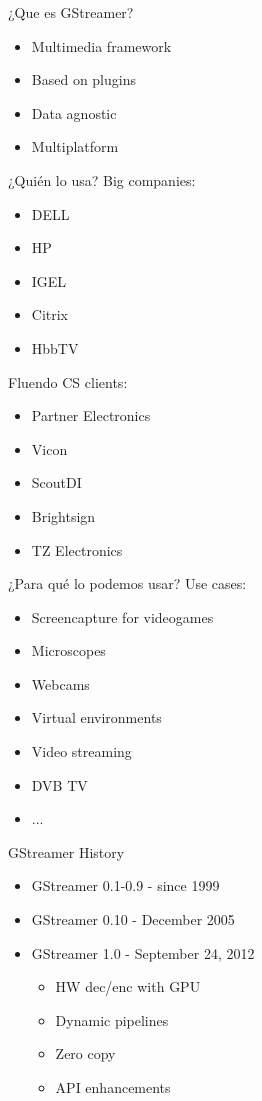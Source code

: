 \documentclass{beamer}
\begin{document}
\begin{frame}{¿Que es GStreamer?}
\begin{itemize}
  \item Multimedia framework
  \item Based on plugins
  \item Data agnostic
  \item Multiplatform
\end{itemize}
\end{frame}

\begin{frame}{¿Quién lo usa?}
Big companies:
\begin{itemize}
  \item DELL
  \item HP
  \item IGEL
  \item Citrix
  \item HbbTV
\end{itemize}
Fluendo CS clients:
\begin{itemize}
  \item Partner Electronics
  \item Vicon
  \item ScoutDI
  \item Brightsign
  \item TZ Electronics
\end{itemize}
\end{frame}

\begin{frame}{¿Para qué lo podemos usar?}
Use cases:
\begin{itemize}
  \item Screencapture for videogames
  \item Microscopes
  \item Webcams
  \item Virtual environments
  \item Video streaming
  \item DVB TV
  \item ...
\end{itemize}
\end{frame}

\begin{frame}{GStreamer History}
\begin{itemize}
  \item GStreamer 0.1-0.9 - since 1999
  \item GStreamer 0.10 - December 2005
  \item GStreamer 1.0 - September 24, 2012
  \begin{itemize}
    \item HW dec/enc with GPU
    \item Dynamic pipelines
    \item Zero copy
    \item API enhancements
  \end{itemize}
\end{itemize}
\end{frame}
\end{document}
